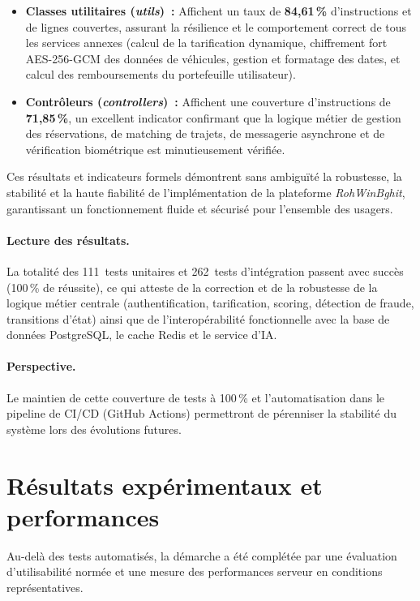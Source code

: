 \documentclass[12pt, a4paper, oneside]{report}
\begin{document}
\begin{itemize}[leftmargin=1.8em]
\begin{itemize}
    \item \textbf{Classes utilitaires (\textit{utils})~:} Affichent un taux de \textbf{84,61\,\%} d'instructions et de lignes couvertes, assurant la résilience et le comportement correct de tous les services annexes (calcul de la tarification dynamique, chiffrement fort AES-256-GCM des données de véhicules, gestion et formatage des dates, et calcul des remboursements du portefeuille utilisateur).
    \item \textbf{Contrôleurs (\textit{controllers})~:} Affichent une couverture d'instructions de \textbf{71,85\,\%}, un excellent indicator confirmant que la logique métier de gestion des réservations, de matching de trajets, de messagerie asynchrone et de vérification biométrique est minutieusement vérifiée.
  \end{itemize}
\end{itemize}

Ces résultats et indicateurs formels démontrent sans ambiguïté la robustesse, la stabilité et la haute fiabilité de l'implémentation de la plateforme \textit{RohWinBghit}, garantissant un fonctionnement fluide et sécurisé pour l'ensemble des usagers.

\paragraph{Lecture des résultats.} La totalité des 111~tests unitaires et 262~tests d'intégration passent avec succès (100\,\% de réussite), ce qui atteste de la correction et de la robustesse de la logique métier centrale (authentification, tarification, scoring, détection de fraude, transitions d'état) ainsi que de l'interopérabilité fonctionnelle avec la base de données PostgreSQL, le cache Redis et le service d'IA.

\paragraph{Perspective.} Le maintien de cette couverture de tests à 100\,\% et l'automatisation dans le pipeline de CI/CD (GitHub Actions) permettront de pérenniser la stabilité du système lors des évolutions futures.

\section{Résultats expérimentaux et performances}
\label{sec:resultats}

Au-delà des tests automatisés, la démarche a été complétée par une évaluation d'utilisabilité normée et une mesure des performances serveur en conditions représentatives.
\end{document}
